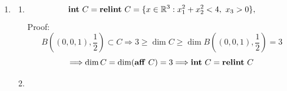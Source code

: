 \documentclass[11pt,letter,notitlepage]{article}
\DeclareMathOperator*{\relint}{\bf relint\,}
\DeclareMathOperator*{\intp}{\bf int\,}
\DeclareMathOperator*{\aff}{\bf aff\,}
\DeclareMathOperator*{\epi}{\bf epi\,}
\theoremstyle{definition}
\begin{document}
\begin{solution}
\begin{enumerate}[label=(\arabic*)]
\begin{enumerate}[label=(\alph*)]
                 Let $h = -g$, then $h$ is convex.
                \[
                t \leq g(x)
                \Longleftrightarrow
                -t \geq -g(x) = h(x)
                \]
                \[
                (x,t) \in \operatorname{hypo} g
                \Longleftrightarrow
                (x,-t) \in \operatorname{epi} h
                \]
                Define the linear mapping:
                \[
                T: \mathbb{R}^{n+1} \to \mathbb{R}^{n+1},\quad 
                T
                \begin{pmatrix}
                    x\\
                    t
                \end{pmatrix}
                =
                \begin{pmatrix}
                    I_n & 0\\
                    0 & -1
                \end{pmatrix} 
                \begin{pmatrix}
                    x\\
                    t
                \end{pmatrix}
                =
                \begin{pmatrix}
                    x\\
                    -t
                \end{pmatrix}
                \]
                According to (1) and (3)(a), $\epi h$ is convex $\Longrightarrow$ $T(\operatorname{hypo} g) = \epi h$ is convex $\Longrightarrow$ $\operatorname{hypo} g$ is convex.
            \end{enumerate}
            \item
            \begin{enumerate}[label=(\alph*)]
                \item 
                \[
                \intp C 
                =
                \relint C
                = 
                \{x\in\mathbb{R}^{3}:x_{1}^{2}+x_{2}^{2}<4,\ x_{3}>0\},
                \]
                Proof:
                \[
                B((0,0,1),\frac{1}{2}) \subset C
                \Longrightarrow
                3 \geq \dim C \geq \dim B((0,0,1),\frac{1}{2}) =3
                \]
                \[
                \Longrightarrow
                \dim C = \dim (\aff C) = 3
                \Longrightarrow
                \intp C = \relint C
                \]
                \item
                \[
\]
\end{enumerate}
\end{enumerate}
\end{solution}
\end{document}
